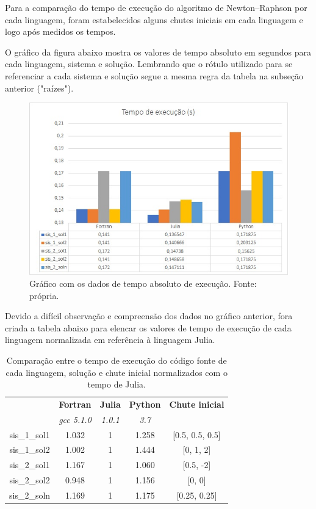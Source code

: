 \documentclass[a4paper, 12pt, openright, oneside]{article}
\begin{document}
Para a comparação do tempo de execução do algoritmo de Newton--Raphson por cada linguagem, foram estabelecidos alguns chutes iniciais em cada linguagem e logo após medidos os tempos.

O gráfico da figura abaixo mostra os valores de tempo absoluto em segundos para cada linguagem, sistema e solução. Lembrando que o rótulo utilizado para se referenciar a cada sistema e solução segue a mesma regra da tabela na subseção anterior ("raízes").

\begin{figure}[!htb]
\centering
\includegraphics[scale=0.7]{Imagens/graf.jpg}
\caption{Gráfico com os dados de tempo absoluto de execução. Fonte: própria.}
\label{galvanometro}
\end{figure}

Devido a difícil observação e compreensão dos dados no gráfico anterior, fora criada a tabela abaixo para elencar os valores de tempo de execução de cada linguagem normalizada em referência à linguagem Julia. 

\begin{table}[htbp]
  \centering
  \caption{Comparação entre o tempo de execução do código fonte de cada linguagem, solução e chute inicial normalizados com o tempo de Julia.}
    \begin{tabular}{|c|c|c|c|c|}
   \multicolumn{1}{r|}{} & \textbf{Fortran} & \textbf{Julia } & \textbf{Python} & \textbf{Chute inicial} \\
    \multicolumn{1}{r|}{} & \textit{gcc 5.1.0} & \textit{1.0.1} & \textit{3.7} &  \\
    sis\_1\_sol1 & 1.032   & 1       & 1.258   & [0.5, 0.5, 0.5] \\

    sis\_1\_sol2 & 1.002   & 1       & 1.444   & [0, 1, 2] \\

    sis\_2\_sol1 & 1.167   & 1       & 1.060   & [0.5, -2] \\

    sis\_2\_sol2 & 0.948   & 1       & 1.156   & [0, 0] \\

    sis\_2\_soln & 1.169   & 1       & 1.175   & [0.25, 0.25] \\

    \end{tabular}%
  \label{tab:addlabel}%
\end{table}%
\end{document}
